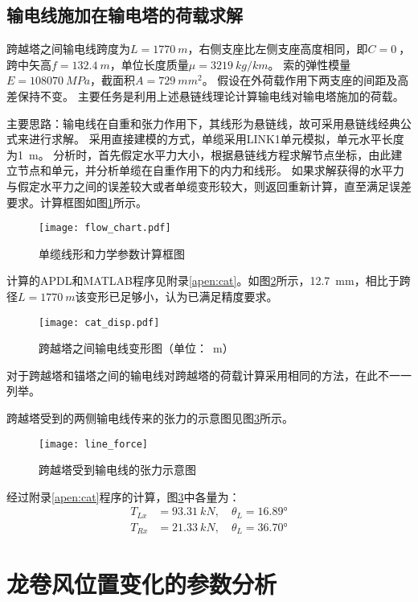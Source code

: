 \subsection{输电线施加在输电塔的荷载求解}

跨越塔之间输电线跨度为$L=\SI{1770}{m}$，右侧支座比左侧支座高度相同，即$C=\SI{0}{}$，跨中矢高$f=\SI{132.4}{m}$，单位长度质量$\mu=\SI{3219}{kg/km}$。
索的弹性模量$E=\SI{108070}{MPa}$，截面积$A=\SI{729}{mm^2}$。
假设在外荷载作用下两支座的间距及高差保持不变。
主要任务是利用上述悬链线理论计算输电线对输电塔施加的荷载。

主要思路：输电线在自重和张力作用下，其线形为悬链线，故可采用悬链线经典公式来进行求解。
采用直接建模的方式，单缆采用LINK1单元模拟，单元水平长度为\SI{1}{m}。
分析时，首先假定水平力大小，根据悬链线方程求解节点坐标，由此建立节点和单元，并分析单缆在自重作用下的内力和线形。
如果求解获得的水平力与假定水平力之间的误差较大或者单缆变形较大，则返回重新计算，直至满足误差要求。计算框图如图\ref{fig:flow-chart}所示。
\begin{figure}[!htpb]
\centering
\texttt{[image: flow\_chart.pdf]}
\caption{单缆线形和力学参数计算框图}
\label{fig:flow-chart}
\end{figure}

计算的APDL和MATLAB程序见附录\ref{apen:cat}。如图\ref{fig:cat-disp}所示，\SI{12.7}{mm}，相比于跨径$L=\SI{1770}{m}$该变形已足够小，认为已满足精度要求。

\begin{figure}[!htbp]
\centering
\texttt{[image: cat\_disp.pdf]}
\caption{跨越塔之间输电线变形图（单位：\SI{}{m}）}
\label{fig:cat-disp}
\end{figure}

对于跨越塔和锚塔之间的输电线对跨越塔的荷载计算采用相同的方法，在此不一一列举。

跨越塔受到的两侧输电线传来的张力的示意图见图\ref{fig:line-force}所示。

\begin{figure}[!htbp]
\centering
\texttt{[image: line\_force]}
\caption{跨越塔受到输电线的张力示意图}
\label{fig:line-force}
\end{figure}

经过附录\ref{apen:cat}程序的计算，图\ref{fig:line-force}中各量为：
\begin{equation}
\begin{split}
  T_{Lx} & = \SI{93.31}{kN},\quad \theta_L  = \ang{16.89} \\
  T_{Rx} & = \SI{21.33}{kN},\quad \theta_L  = \ang{36.70}
\end{split}
\end{equation}



\section{龙卷风位置变化的参数分析}
